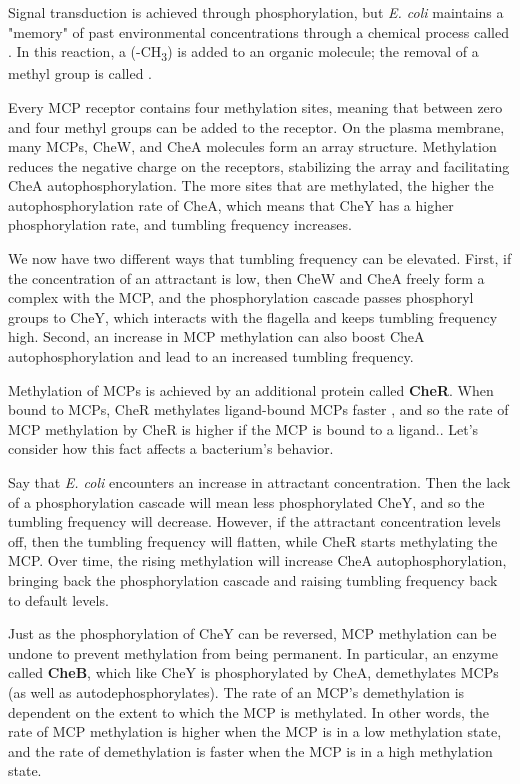 Signal transduction is achieved through phosphorylation, but \textit{E. coli} maintains a "memory" of past environmental concentrations through a chemical process called . In this  reaction, a  (-CH\textsubscript{3}) is added to an organic molecule; the removal of a methyl group is called .

Every MCP receptor contains four methylation sites, meaning that between zero and four methyl groups can be added to the receptor. On the plasma membrane, many MCPs, CheW, and CheA molecules form an array structure. Methylation reduces the negative charge on the receptors, stabilizing the array and facilitating CheA autophosphorylation. The more sites that are methylated, the higher the autophosphorylation rate of CheA, which means that CheY has a higher phosphorylation rate, and tumbling frequency increases.

We now have two different ways that tumbling frequency can be elevated. First, if the concentration of an attractant is low, then CheW and CheA freely form a complex with the MCP, and the phosphorylation cascade passes phosphoryl groups to CheY, which interacts with the flagella and keeps tumbling frequency high. Second, an increase in MCP methylation can also boost CheA autophosphorylation and lead to an increased tumbling frequency.

Methylation of MCPs is achieved by an additional protein called \textbf{CheR}. When bound to MCPs, CheR methylates ligand-bound MCPs faster \citep{Amin_2010, Terwilliger_1986}, and so the rate of MCP methylation by CheR is higher if the MCP is bound to a ligand.\citep{Spiro_1997}. Let's consider how this fact affects a bacterium's behavior.

Say that \textit{E. coli} encounters an increase in attractant concentration. Then the lack of a phosphorylation cascade will mean less phosphorylated CheY, and so the tumbling frequency will decrease. However, if the attractant concentration levels off, then the tumbling frequency will flatten, while CheR starts methylating the MCP. Over time, the rising methylation will increase CheA autophosphorylation, bringing back the phosphorylation cascade and raising tumbling frequency back to default levels.

Just as the phosphorylation of CheY can be reversed, MCP methylation can be undone to prevent methylation from being permanent. In particular, an enzyme called \textbf{CheB}, which like CheY is phosphorylated by CheA, demethylates MCPs (as well as autodephosphorylates). The rate of an MCP's demethylation is dependent on the extent to which the MCP is methylated. In other words, the rate of MCP methylation is higher when the MCP is in a low methylation state, and the rate of demethylation is faster when the MCP is in a high methylation state.\citep{Spiro_1997}

